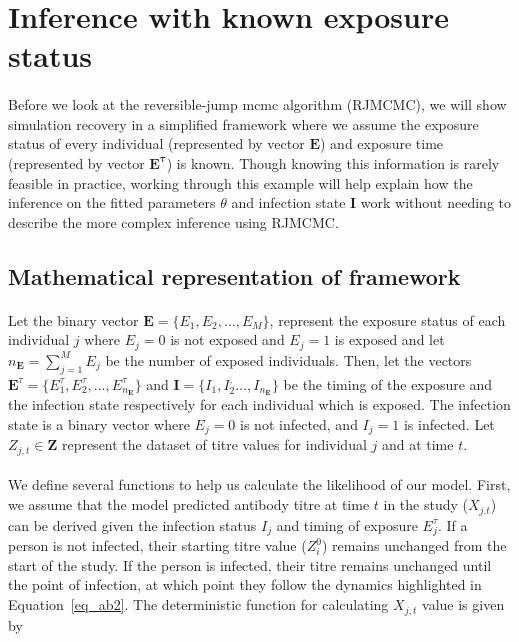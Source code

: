 \documentclass{article}
\begin{document}
\newpage

\section{Inference with known exposure status}

\paragraph{}Before we look at the reversible-jump mcmc algorithm (RJMCMC), we will show simulation recovery in a simplified framework where we assume the exposure status of every individual (represented by vector $\mathbf{E}$) and exposure time (represented by vector $\mathbf{E^\tau}$) is known. Though knowing this information is rarely feasible in practice, working through this example will help explain how the inference on the fitted parameters $\theta$ and infection state $\mathbf{I}$ work without needing to describe the more complex inference using RJMCMC. 

\subsection{Mathematical representation of framework}

\paragraph{}Let the binary vector $\mathbf{E} = \{ E_1, E_2, \dots, E_M\}$, represent the exposure status of each individual $j$ where $E_j = 0$ is not exposed and $E_j = 1$ is exposed and let $n_\mathbf{E} = \sum_{j = 1}^ME_j$ be the number of exposed individuals. Then, let the vectors $\mathbf{E}^\tau = \{E_1^\tau, E_2^\tau, \dots, E^\tau_{n_\mathbf{E}}\}$ and $\mathbf{I} = \{I_1, I_2^, \dots, I_{n_\mathbf{E}}\}$ be the timing of the exposure and the infection state respectively for each individual which is exposed. The infection state is a binary vector where $E_j = 0$ is not infected, and $I_j = 1$ is infected. Let $Z_{j, t} \in \mathbf{Z}$ represent the dataset of titre values for individual $j$ and at time $t$. 

\paragraph{}We define several functions to help us calculate the likelihood of our model. First, we assume that the model predicted antibody titre at time $t$ in the study ($X_{j.t}$) can be derived given the infection status $I_j$ and timing of exposure $E_j^\tau$. If a person is not infected, their starting titre value ($Z^0_i$) remains unchanged from the start of the study. If the person is infected, their titre remains unchanged until the point of infection, at which point they follow the dynamics highlighted in Equation~\ref{eq_ab2}. The deterministic function for calculating $X_{j,t}$ value is given by
\end{document}
